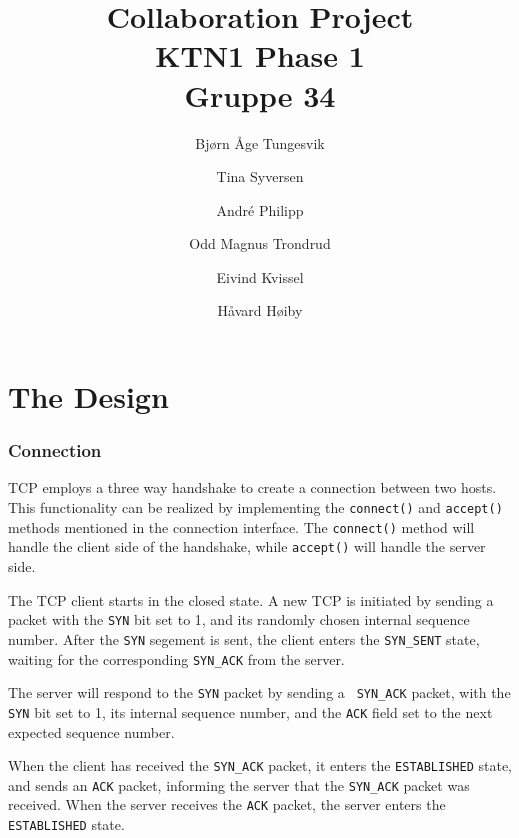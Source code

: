 \documentclass{article}
\begin{document}
\begin{titlepage}
\title{Collaboration Project\\
\textbf{KTN1 Phase 1}\\
Gruppe 34}
\author{Bj\o rn \AA ge Tungesvik\and Tina Syversen\and Andr\'e Philipp\and Odd Magnus Trondrud\and Eivind Kvissel\and H\aa vard H\o iby}
\maketitle
\end{titlepage}\qquad 

\part{The Design}

\section{Connection}

TCP employs a three way handshake to create a connection between two hosts.
This functionality can be realized by implementing the \texttt{connect()}
and \texttt{accept()} methods mentioned in the connection interface. The 
\texttt{connect()} method will handle the client side of the handshake,
while \texttt{accept()} will handle the server side.

\bigskip

The TCP client starts in the closed state. A new TCP is initiated by sending
a packet with the \texttt{SYN} bit set to 1, and its randomly chosen
internal sequence number. After the \texttt{SYN} segement is sent, the
client enters the \texttt{\texttt{SYN}\_SENT} state, waiting for the
corresponding \texttt{\texttt{SYN}\_ACK} from the server.

\bigskip

The server will respond to the \texttt{SYN} packet by sending a \texttt{%
\texttt{SYN}\_ACK} packet, with the \texttt{SYN} bit set to 1, its internal
sequence number, and the \texttt{ACK} field set to the next expected
sequence number.

\bigskip

When the client has received the \texttt{\texttt{SYN}\_ACK} packet, it
enters the \texttt{ESTABLISHED} state, and sends an \texttt{ACK} packet,
informing the server that the \texttt{\texttt{SYN}\_ACK} packet was
received. When the server receives the \texttt{ACK} packet, the server
enters the \texttt{ESTABLISHED} state.
\end{document}
